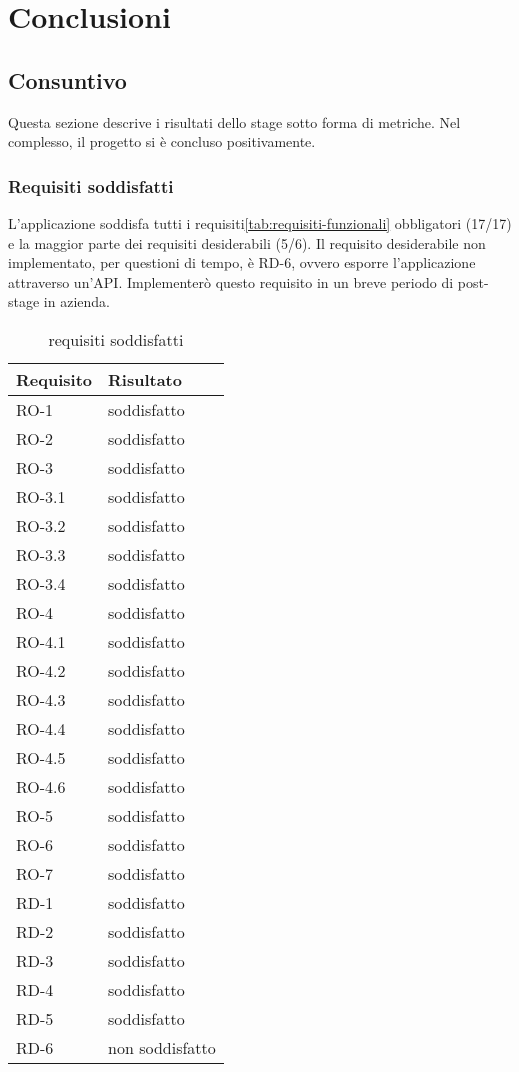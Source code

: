 
\chapter{Conclusioni}
\label{cap:conclusioni}

\section{Consuntivo}
Questa sezione descrive i risultati dello stage sotto forma di metriche. Nel complesso, il progetto si è concluso positivamente.
\subsection{Requisiti soddisfatti}
L'applicazione soddisfa tutti i requisiti\ref{tab:requisiti-funzionali} obbligatori (17/17) e la maggior parte dei requisiti desiderabili (5/6). Il requisito desiderabile non implementato, per questioni di tempo, è RD-6, ovvero esporre l'applicazione attraverso un'API. Implementerò questo requisito in un breve periodo di post-stage in azienda.
\label{tab:requisiti-resoconto}
\begin{longtable}{|l l|}
\caption{requisiti soddisfatti}\\
\hline
\textbf{Requisito} & \textbf{Risultato} \\
\hline
\endhead
RO-1     & soddisfatto\\
RO-2     & soddisfatto\\
RO-3     & soddisfatto\\
RO-3.1   & soddisfatto\\
RO-3.2   & soddisfatto\\
RO-3.3   & soddisfatto\\
RO-3.4   & soddisfatto\\
RO-4     & soddisfatto\\
RO-4.1   & soddisfatto\\
RO-4.2   & soddisfatto\\
RO-4.3   & soddisfatto\\
RO-4.4   & soddisfatto\\
RO-4.5   & soddisfatto\\
RO-4.6   & soddisfatto\\
RO-5     & soddisfatto\\
RO-6     & soddisfatto\\
RO-7     & soddisfatto\\
RD-1     & soddisfatto\\
RD-2     & soddisfatto\\
RD-3     & soddisfatto\\
RD-4     & soddisfatto\\
RD-5     & soddisfatto\\
RD-6     & non soddisfatto\\
\hline
\end{longtable}

